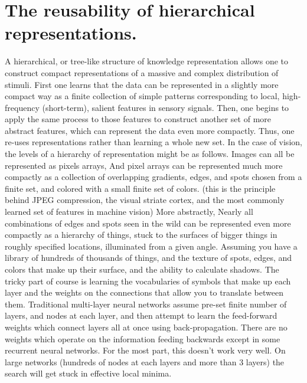 \documentclass[12pt]{article}
\begin{document}
	\section{The reusability of hierarchical representations.}
	
	A hierarchical, or tree-like structure of knowledge representation allows one to construct compact representations of a massive and complex distribution of stimuli. First one learns that the data can be represented in a slightly more compact way as a finite collection of simple patterns corresponding to local, high-frequency (short-term), salient features in sensory signals. Then, one begins to apply the same process to those features to construct another set of more abstract features, which can represent the data even more compactly. Thus, one re-uses representations rather than learning a whole new set.
	In the case of vision, the levels of a hierarchy of representation might be as follows. Images can all be represented as pixels arrays, And pixel arrays can be represented much more compactly as a collection of overlapping gradients, edges, and spots chosen from a finite set, and colored with a small finite set of colors. (this is the principle behind JPEG compression, the visual striate cortex, and the most commonly learned set of features in machine vision) More abstractly, Nearly all combinations of edges and spots seen in the wild can be represented even more compactly as a hierarchy of things, stuck to the surfaces of bigger things in roughly specified locations, illuminated from a given angle. Assuming you have a library of hundreds of thousands of things, and the texture of spots, edges, and colors that make up their surface, and the ability to calculate shadows.
	The tricky part of course is learning the vocabularies of symbols that make up each layer and the weights on the connections that allow you to translate between them. Traditional multi-layer neural networks assume pre-set finite number of layers, and nodes at each layer, and then attempt to learn the feed-forward weights which connect layers  all at once using back-propagation. There are no weights which operate on the information feeding backwards except in some recurrent neural networks. For the most part, this doesn't work very well. On large networks (hundreds of nodes at each layers and more than 3 layers) the search will get stuck in effective local minima.
	
\end{document}

